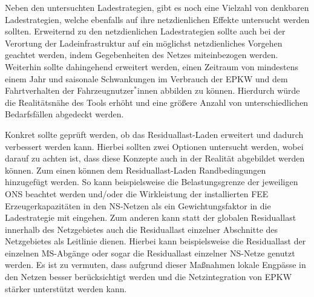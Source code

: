 Neben den untersuchten Ladestrategien, gibt es noch eine Vielzahl von denkbaren Ladestrategien, welche ebenfalls auf ihre netzdienlichen Effekte untersucht werden sollten.
Erweiternd zu den netzdienlichen Ladestrategien sollte auch bei der Verortung der Ladeinfrastruktur auf ein möglichst netzdienliches Vorgehen geachtet werden, indem Gegebenheiten des Netzes miteinbezogen werden.
Weiterhin sollte  dahingehend erweitert werden, einen Zeitraum von mindestens einem Jahr und saisonale Schwankungen im Verbrauch der \gls{EPKW} und dem Fahrtverhalten der Fahrzeugnutzer\(^*\)innen abbilden zu können.
Hierdurch würde die Realitätsnähe des Tools erhöht und eine größere Anzahl von unterschiedlichen Bedarfsfällen abgedeckt werden.\medskip

Konkret sollte geprüft werden, ob das Residuallast-Laden erweitert und dadurch verbessert werden kann.
Hierbei sollten zwei Optionen untersucht werden, wobei darauf zu achten ist, dass diese Konzepte auch in der Realität abgebildet werden können.
Zum einen können dem Residuallast-Laden Randbedingungen hinzugefügt werden.
So kann beispielsweise die Belastungsgrenze der jeweiligen \gls{ONS} beachtet werden und/oder die Wirkleistung der installierten \gls{FEE} Erzeugerkapazitäten in den \gls{NS}-Netzen als ein Gewichtungsfaktor in die Ladestrategie mit eingehen.
Zum anderen kann statt der globalen Residuallast innerhalb des Netzgebietes auch die Residuallast einzelner Abschnitte des Netzgebietes als Leitlinie dienen.
Hierbei kann beispielsweise die Residuallast der einzelnen \gls{MS}-Abgänge oder sogar die Residuallast einzelner \gls{NS}-Netze genutzt werden.
Es ist zu vermuten, dass aufgrund dieser Maßnahmen lokale Engpässe in den Netzen besser berücksichtigt werden und die Netzintegration von \gls{EPKW} stärker unterstützt werden kann.

